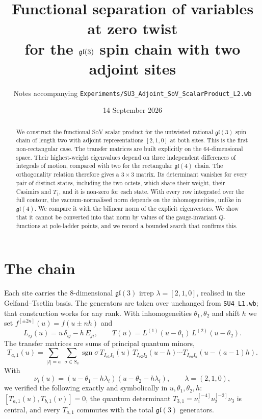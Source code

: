 \documentclass[11pt]{article}
\title{Functional separation of variables at zero twist\\
for the $\gl(3)$ spin chain with two adjoint sites}
\author{Notes accompanying \texttt{Experiments/SU3\_Adjoint\_SoV\_ScalarProduct\_L2.wb}}
\date{14 September 2026}
\newcommand{\sh}[1]{^{[#1]}}
\newcommand{\gl}{\mathfrak{gl}}
\begin{document}
\maketitle

\begin{abstract}
We construct the functional SoV scalar product for the untwisted rational $\gl(3)$ spin chain of
length two with adjoint representations $[2,1,0]$ at both sites. This is the first
non-rectangular case. The transfer matrices are built explicitly on the $64$-dimensional space.
Their highest-weight eigenvalues depend on three independent differences of integrals of motion,
compared with two for the rectangular $\gl(4)$ chain. The orthogonality relation therefore gives a
$3\times3$ matrix. Its determinant vanishes for every pair of distinct states, including the two
octets, which share their weight, their Casimirs and $T_1$, and it is non-zero for each state.
With every row integrated over the full contour, the vacuum-normalised norm depends on the
inhomogeneities, unlike in $\gl(4)$. We compare it with the bilinear norm of the explicit
eigenvectors. We show that it cannot be converted into that norm by values of the gauge-invariant
$Q$-functions at pole-ladder points, and we record a bounded search that confirms this.
\end{abstract}

\tableofcontents

\section{The chain}

Each site carries the $8$-dimensional $\gl(3)$ irrep $\lambda=[2,1,0]$, realised in the
Gelfand--Tsetlin basis. The generators are taken over unchanged from \texttt{SU4\_L1.wb}; that
construction works for any rank. With inhomogeneities $\theta_1,\theta_2$ and shift $h$ we set
$f\sh{\pm2n}(u)=f(u\pm nh)$ and
\begin{equation}
L_{ij}(u)=u\,\delta_{ij}-h\,E_{ji},\qquad
T(u)=L^{(1)}(u-\theta_1)\,L^{(2)}(u-\theta_2).
\end{equation}
The transfer matrices are sums of principal quantum minors,
\begin{equation}
T_{a,1}(u)=\sum_{|I|=a}\ \sum_{\sigma\in S_a}\operatorname{sgn}\sigma\,
T_{I_{\sigma1}I_1}(u)\,T_{I_{\sigma2}I_2}(u-h)\cdots T_{I_{\sigma a}I_a}(u-(a-1)h).
\end{equation}
With
\begin{equation}
\nu_i(u)=(u-\theta_1-h\lambda_i)(u-\theta_2-h\lambda_i),\qquad \lambda=(2,1,0),
\end{equation}
we verified the following exactly and symbolically in $u,\theta_1,\theta_2,h$:
$[T_{a,1}(u),T_{b,1}(v)]=0$, the quantum determinant
$T_{3,1}=\nu_1\sh{-4}\nu_2\sh{-2}\nu_3$ is central, and every $T_{a,1}$ commutes with the total
$\gl(3)$ generators.
\end{document}
